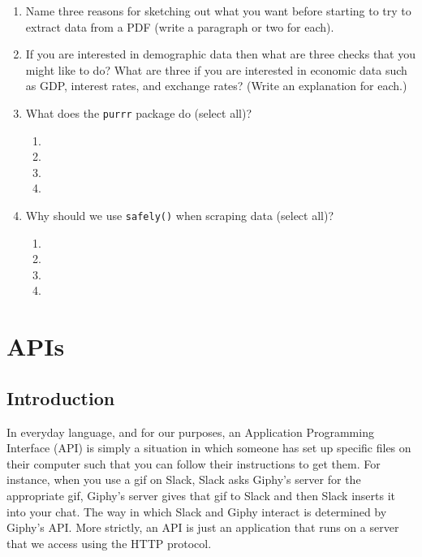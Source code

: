 \documentclass[
]{book}
\begin{document}
\begin{enumerate}
  \begin{enumerate}
  \def\labelenumii{\alph{enumii}.}
  \item
  \item
  \item
  \item
  \end{enumerate}
\item
  Name three reasons for sketching out what you want before starting to try to extract data from a PDF (write a paragraph or two for each).
\item
  If you are interested in demographic data then what are three checks that you might like to do? What are three if you are interested in economic data such as GDP, interest rates, and exchange rates? (Write an explanation for each.)
\item
  What does the \texttt{purrr} package do (select all)?

  \begin{enumerate}
  \def\labelenumii{\alph{enumii}.}
  \item
  \item
  \item
  \item
  \end{enumerate}
\item
  Why should we use \texttt{safely()} when scraping data (select all)?

  \begin{enumerate}
  \def\labelenumii{\alph{enumii}.}
  \item
  \item
  \item
  \item
  \end{enumerate}
\end{enumerate}

\hypertarget{apis}{%
\section{APIs}\label{apis}}

\hypertarget{introduction-7}{%
\subsection{Introduction}\label{introduction-7}}

In everyday language, and for our purposes, an Application Programming Interface (API) is simply a situation in which someone has set up specific files on their computer such that you can follow their instructions to get them. For instance, when you use a gif on Slack, Slack asks Giphy's server for the appropriate gif, Giphy's server gives that gif to Slack and then Slack inserts it into your chat. The way in which Slack and Giphy interact is determined by Giphy's API. More strictly, an API is just an application that runs on a server that we access using the HTTP protocol.
\end{document}
